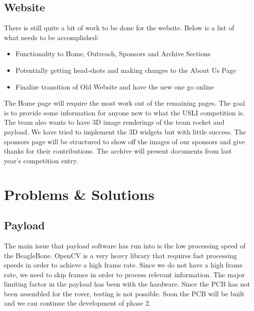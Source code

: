 \documentclass[journal,10pt,draftclsnofoot,onecolumn,compsoc]{IEEEtran} \usepackage[margin=0.75in]{geometry}
\begin{document}
\subsection{Website}
There is still quite a bit of work to be done for the website. Below is a list of what needs to be accomplished:
\begin{itemize}
    \item Functionality to Home, Outreach, Sponsors and Archive Sections
    \item Potentially getting head-shots and making changes to the About Us Page
    \item Finalize transition of Old Website and have the new one go online
\end{itemize}

\noindent The Home page will require the most work out of the remaining pages. The goal is to provide some information for anyone new to what the USLI competition is. The team also wants to have 3D image renderings of the team rocket and payload. We have tried to implement the 3D widgets but with little success. The sponsors page will be structured to show off the images of our sponsors and give thanks for their contributions. The archive will present documents from last year's competition entry. 

\section{Problems \& Solutions}

\subsection{Payload}

The main issue that payload software has run into is the low processing speed of the BeagleBone. OpenCV is a very heavy library that requires fast processing speeds in order to achieve a high frame rate. Since we do not have a high frame rate, we need to skip frames in order to process relevant information. The major limiting factor in the payload has been with the hardware. Since the PCB has not been assembled for the rover, testing is not possible. Soon the PCB will be built and we can continue the development of phase 2. 
\end{document}
